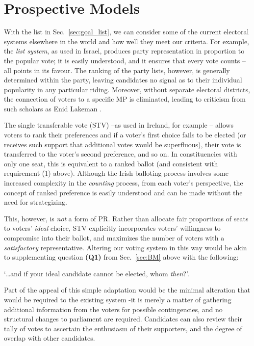 \documentclass[DIV=calc, paper=a4, fontsize=11pt, twocolumn]{scrartcl}	 %
\begin{document}
\section{Prospective Models}
\label{sec:alt_models}

With the list in Sec.~\ref{sec:goal_list}, we can consider some of the current electoral systems elsewhere in the world and how well they meet our criteria. For example, the \emph{list system}, as used in Israel, produces party representation in proportion to the popular vote; it is easily understood, and it ensures that every vote counts \---all points in its favour. 
The ranking of the party lists, however, is generally determined within the party, leaving candidates no signal as to their individual popularity in any particular riding. Moreover, without separate electoral districts, the connection of voters to a specific MP is eliminated, leading to criticism from such scholars as Enid Lakeman\cite{Lakeman}
.

The single transferable vote (STV) \---as used in Ireland, for example\cite{Irish_howto_vote_doc}
\--- allows voters to  rank their preferences and if a voter's first choice fails to be elected (or receives such support that additional votes would be superfluous), their vote is transferred to the voter's second preference, and so on. In constituencies with only one seat, this is equivalent to a ranked ballot (and consistent with requirement (1) above). 
Although the Irish balloting process involves some increased complexity in the \emph{counting} process, from each voter's perspective, the concept of ranked preference is easily understood and can be made without the need for strategizing.

This, however, is \emph{not} a form of PR. 
Rather than allocate fair proportions of seats to voters' \emph{ideal} choice, STV explicitly incorporates voters' willingness to compromise into their ballot, and maximizes the number of voters with a \emph{satisfactory} representative.
Altering our voting system in this way would be akin to supplementing question \textbf{(Q1)} from Sec.~\ref{sec:BM} above with the following: 

\begin{tcolorbox}[colback=white!5!white,colframe=blue!55!black]
`\ldots and if your ideal candidate cannot be elected, whom \emph{then}?'. 
\end{tcolorbox}

Part of the appeal of this simple adaptation would be the minimal alteration that would be required to the existing system \--it is merely a matter of gathering additional information from the voters for possible contingencies, and no structural changes to parliament are required. Candidates can also review their tally of votes to ascertain the enthusiasm of their supporters, and the degree of overlap with other candidates. 
\end{document}
